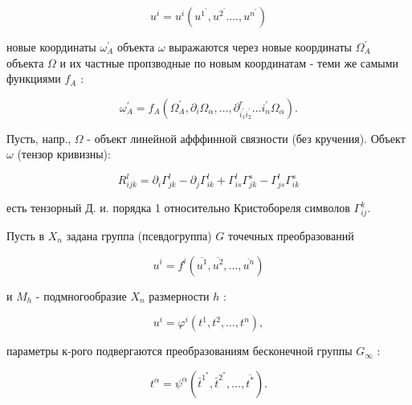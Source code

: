 \documentclass[10pt]{article}
\begin{document}
\[

u^{i}=u^{i}\left(u^{1^{\prime}}, u^{2^{\prime}} . \ldots, u^{n^{\prime}}\right)

\]



новые координаты $\omega_{A}^{\prime}$ объекта $\omega$ выражаются через новые координаты $\Omega_{A}^{\prime}$ объекта $\Omega$ и их частные пропзводные по новым координатам - теми же самыми функциями $f_{A}$ :



\[

\omega_{A}^{\prime}=f_{A}\left(\Omega_{A}^{\prime}, \partial_{i} \Omega_{\alpha}, \ldots, \partial_{i_{1}^{\prime} i_{2}^{\prime}}^{r} \ldots i_{n}^{\prime} \Omega_{\alpha}\right) .

\]



Пусть, напр., $\Omega$ - объект линейной афффинной связности (без кручения). Объект $\omega$ (тензор кривизны):



\[

R_{i j k}^{l}=\partial_{i} \Gamma_{j k}^{l}-\partial_{j} \Gamma_{i k}^{l}+\Gamma_{i s}^{l} \Gamma_{j k}^{s}-\Gamma_{j s}^{l} \Gamma_{i k}^{s}

\]



есть тензорный Д. и. порядка 1 относительно Кристобореля символов $\Gamma_{i j}^{k}$.



Пусть в $X_{n}$ задана группа (псевдогруппа) $G$ точечных преобразований



\[

u^{i}=f^{i}\left(\overline{u^{1}}, \overline{u^{2}}, \ldots, \overline{u^{n}}\right)

\]



и $M_{h}$ - подмногообразие $X_{n}$ размерности $h$ :



\[

u^{i}=\varphi^{i}\left(t^{1}, t^{2}, \ldots, t^{n}\right),

\]



параметры к-рого подвергаются преобразованиям бесконечной группы $G_{\infty}$ :



\[

t^{\alpha}=\psi^{\alpha}\left(\bar{t}^{1^{*}}, \bar{t}^{2^{*}}, \ldots, \overline{t^{*}}\right) .

\]
\end{document}
